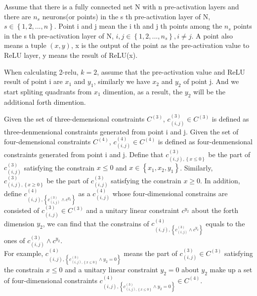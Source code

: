 \documentclass[runningheads]{llncs}
\begin{document}
\begin{definition}\label{Def1}
Assume that there is a fully connected net N with n pre-activation layers and there are $n_{s}$ neurons(or points) in the s th pre-activation layer of N, $s\in \left \{1,2,...,n\right \}$. Point i and j mean the i th and j th points among the $n_{s}$ points in the s th pre-activation layer of N, $i,j\in \left \{1,2,...,n_{s}\right \},i\neq j$. A point also means a tuple $(x,y)$, x is the output of the point as the pre-activation value to ReLU layer, y means the result of ReLU(x).

When calculating 2-relu, $k=2$, assume that the pre-activation value and ReLU result of point i are $x_{1}$ and $y_{1}$, similarly we have $x_{2}$ and $y_{2}$ of point j. And we start spliting quadrants from $x_{1}$ dimention, as a result, the $y_{2}$ will be the additional forth dimention.

Given the set of three-demensional constraints $C^{(3)}$, $c_{\left ( i,j\right )}^{(3)}\in C^{(3)}$ is defined as three-denmensional constraints generated from point i and j. Given the set of four-demensional constraints $C^{(4)}$, $c_{\left ( i,j\right )}^{(4)}\in C^{(4)}$ is defined as four-denmensional constraints generated from point i and j. Define that $c^{(3)}_{\left ( i,j\right ),\left \{x\leq 0\right \}}$ be the part of $c_{\left ( i,j\right )}^{(3)}$ satisfying the constrain $x\leq 0$ and $x\in \left \{x_{1},x_{2},y_{1}\right \}$. Similarly,  $c^{(3)}_{\left ( i,j\right ),\left \{x\geq 0\right \}}$ be the part of $c_{\left ( i,j\right )}^{(3)}$ satisfying the constrain $x\geq 0$. In addition, define $c_{(i,j),\left \{ c_{\left ( i,j\right )}^{(3)}\wedge c^{y_{2}}\right \}}^{(4)}$ as a $c_{\left ( i,j\right )}^{(4)}$ whose four-dimensional constrains are consisted of $c_{\left ( i,j\right )}^{(3)}\in C^{(3)}$ and a unitary linear constraint $c^{y_{2}}$ about the forth dimension $y_{2}$, we can find that the constrains of $c_{(i,j),\left \{ c_{\left ( i,j\right )}^{(3)}\wedge c^{y_{2}}\right \}}^{(4)}$ equals to the ones of $c_{\left ( i,j\right )}^{(3)}\wedge c^{y_{2}}$.
\\For example,  $c_{\left ( i,j\right ),\left \{ c^{(3)}_{\left ( i,j\right ),\left \{x\leq 0\right \}}\wedge y_{2}=0\right \}}^{(4)}$ means the part of $c_{\left ( i,j\right )}^{(3)}\in C^{(3)}$ satisfying the constrain $x\leq 0$ and a unitary linear constraint $y_{2}=0$ about $y_{2}$ make up a set of four-dimensional constraints $c_{\left ( i,j\right ),\left \{ c^{(3)}_{\left ( i,j\right ),\left \{x\leq 0\right \}}\wedge y_{2}=0\right \}}^{(4)}\in C^{(4)}$.
\end{definition}
\end{document}
